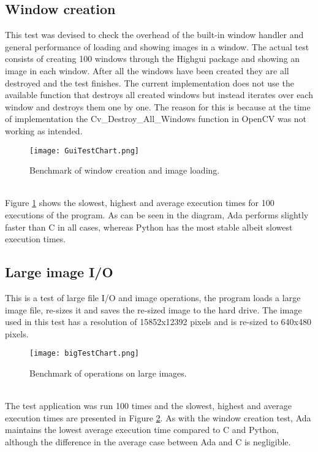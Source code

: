 \subsection{Window creation}
This test was devised to check the overhead of the built-in window handler and general performance of loading and showing images in a window. The actual test consists of creating 100 windows through the Highgui package and showing an image in each window. After all the windows have been created they are all destroyed and the test finishes. The current implementation does not use the available function that destroys all created windows but instead iterates over each window and destroys them one by one. The reason for this is because at the time of implementation the Cv_Destroy_All_Windows function in OpenCV was not working as intended.
\begin{figure}
\centering
\texttt{[image: GuiTestChart.png]}
\caption{Benchmark of window creation and image loading.}
\label{fig:GuiTestChart}
\end{figure}
\\
Figure \ref{fig:GuiTestChart} shows the slowest, highest and average execution times for 100 executions of the program. As can be seen in the diagram, Ada performs slightly faster than C in all cases, whereas Python has the most stable albeit slowest execution times.
\subsection{Large image I/O}
This is a test of large file I/O and image operations, the program loads a large image file, re-sizes it and saves the re-sized image to the hard drive. The image used in this test has a resolution of 15852x12392 pixels and is re-sized to 640x480 pixels. 
\begin{figure}
\centering
\texttt{[image: bigTestChart.png]}
\caption{Benchmark of operations on large images.}
\label{fig:bigTestChart}
\end{figure}
\\
The test application was run 100 times and the slowest, highest and average execution times are presented in Figure \ref{fig:bigTestChart}. As with the window creation test, Ada maintains the lowest average execution time compared to C and Python, although the difference in the average case between Ada and C is negligible.
